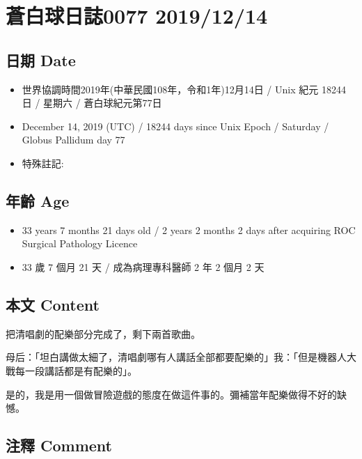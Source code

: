 \documentclass[
]{article}
\providecommand{\tightlist}{%
  \setlength{\itemsep}{0pt}\setlength{\parskip}{0pt}}
\begin{document}
\hypertarget{ux84bcux767dux7403ux65e5ux8a8c0077-20191214}{%
\section{蒼白球日誌0077
2019/12/14}\label{ux84bcux767dux7403ux65e5ux8a8c0077-20191214}}

\hypertarget{ux65e5ux671f-date-13}{%
\subsection{日期 Date}\label{ux65e5ux671f-date-13}}

\begin{itemize}
\tightlist
\item
  世界協調時間2019年(中華民國108年，令和1年)12月14日 / Unix 紀元 18244
  日 / 星期六 / 蒼白球紀元第77日
\item
  December 14, 2019 (UTC) / 18244 days since Unix Epoch / Saturday /
  Globus Pallidum day 77
\item
  特殊註記:
\end{itemize}

\hypertarget{ux5e74ux9f61-age-13}{%
\subsection{年齡 Age}\label{ux5e74ux9f61-age-13}}

\begin{itemize}
\tightlist
\item
  33 years 7 months 21 days old / 2 years 2 months 2 days after
  acquiring ROC Surgical Pathology Licence
\item
  33 歲 7 個月 21 天 / 成為病理專科醫師 2 年 2 個月 2 天
\end{itemize}

\hypertarget{ux672cux6587-content-13}{%
\subsection{本文 Content}\label{ux672cux6587-content-13}}

把清唱劇的配樂部分完成了，剩下兩首歌曲。

母后：「坦白講做太細了，清唱劇哪有人講話全部都要配樂的」我：「但是機器人大戰每一段講話都是有配樂的」。

是的，我是用一個做冒險遊戲的態度在做這件事的。彌補當年配樂做得不好的缺憾。

\hypertarget{ux6ce8ux91cb-comment-12}{%
\subsection{注釋 Comment}\label{ux6ce8ux91cb-comment-12}}
\end{document}
